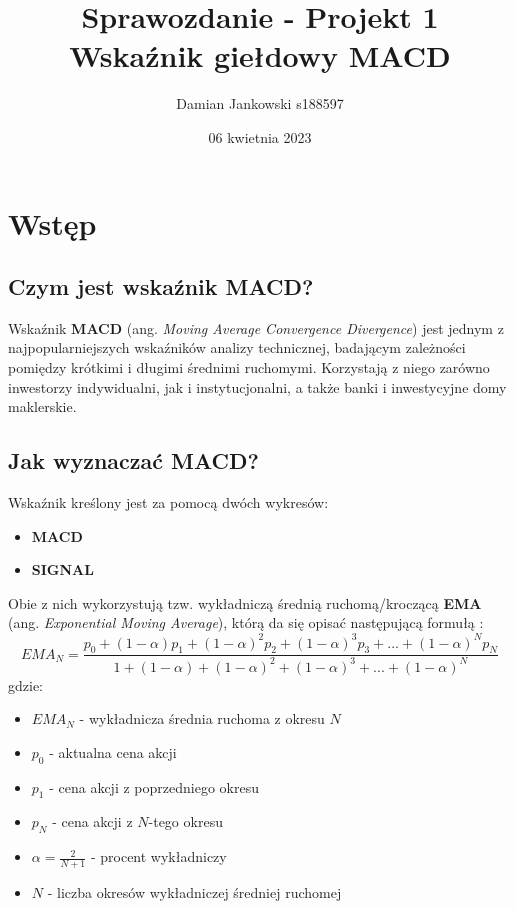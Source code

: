\documentclass{article}
\title{Sprawozdanie - Projekt 1\\Wskaźnik giełdowy MACD}
\author{Damian Jankowski s188597}
\date{06 kwietnia 2023}
\begin{document}
    \maketitle

    \section{Wstęp}
    \subsection{Czym jest wskaźnik MACD?}

    Wskaźnik \textbf{MACD} (ang. \textit{Moving Average Convergence Divergence}) 
    jest jednym z najpopularniejszych wskaźników analizy technicznej, badającym
    zależności pomiędzy krótkimi i długimi średnimi ruchomymi.
    Korzystają z niego zarówno inwestorzy indywidualni, 
    jak i instytucjonalni, a także banki i inwestycyjne domy maklerskie. \cite{macd}

    \subsection{Jak wyznaczać MACD?}

    Wskaźnik kreślony jest za pomocą dwóch wykresów:
    \begin{itemize}
        \item \textbf{MACD}
        \item \textbf{SIGNAL}
    \end{itemize}

    Obie z nich wykorzystują tzw. wykładniczą średnią ruchomą/kroczącą
    \textbf{EMA} (ang. \textit{Exponential Moving Average}), którą da się opisać
    następującą formułą \cite{ema}:
    \begin{equation}
        EMA_{N} = \frac{p_{0} + (1-\alpha)p_{1} + (1-\alpha)^2p_{2} + 
        (1-\alpha)^3p_{3} + ... + (1-\alpha)^Np_{N} }
        {1 + (1-\alpha) + (1-\alpha)^2 + (1-\alpha)^3 + ... + (1-\alpha)^N}
    \end{equation}
    gdzie:
    \begin{itemize}
        \item $EMA_{N}$ - wykładnicza średnia ruchoma z okresu $N$
        \item $p_{0}$ - aktualna cena akcji
        \item $p_{1}$ - cena akcji z poprzedniego okresu
        \item $p_{N}$ - cena akcji z $N$-tego okresu
        \item $\alpha = \frac{2}{N+1}$ - procent wykładniczy
        \item $N$ - liczba okresów wykładniczej średniej ruchomej
    \end{itemize}
\end{document}
